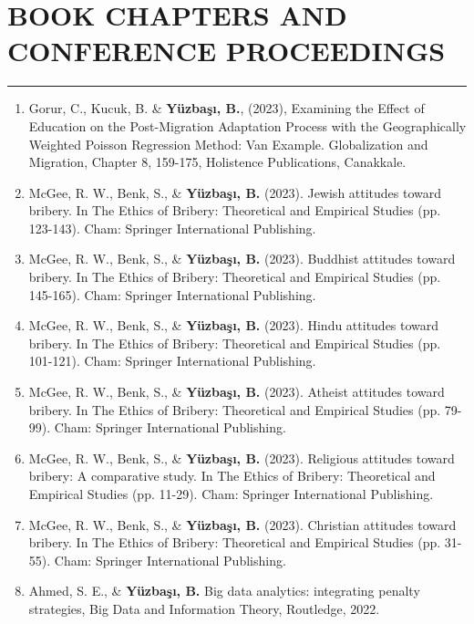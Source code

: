 \documentclass[10pt,letterpaper]{article}
\newcommand{\NewPart}[2]{%
	\Needspace{7\baselineskip}%
	\vspace{0.45em}%
	\section*{\sffamily\large\bfseries\color{MidnightBlue}\uppercase{#1} #2}%
	\vspace{-0.7em}\noindent\color{MidnightBlue}\rule{\textwidth}{0.55pt}\color{Black}\vspace{0.25em}}
\newenvironment{etaremune}{\begin{enumerate}}{\end{enumerate}}
\begin{document}
\NewPart{Book Chapters and Conference Proceedings}{}

\begin{etaremune}
\renewcommand{\theenumi}{B\arabic{enumi}}

\item Gorur, C., Kucuk, B. \& {\bf Y\"{u}zba\c{s}{\i}, B.}, (2023), Examining the Effect of Education on the Post-Migration Adaptation Process with the Geographically Weighted Poisson Regression Method: Van Example. Globalization and Migration, Chapter 8, 159-175, Holistence Publications, Canakkale.

\item McGee, R. W., Benk, S., \& {\bf Y\"{u}zba\c{s}{\i}, B.} (2023). Jewish attitudes toward bribery. In The Ethics of Bribery: Theoretical and Empirical Studies (pp. 123-143). Cham: Springer International Publishing.

\item McGee, R. W., Benk, S., \& {\bf Y\"{u}zba\c{s}{\i}, B.} (2023). Buddhist attitudes toward bribery. In The Ethics of Bribery: Theoretical and Empirical Studies (pp. 145-165). Cham: Springer International Publishing.

\item McGee, R. W., Benk, S., \& {\bf Y\"{u}zba\c{s}{\i}, B.} (2023). Hindu attitudes toward bribery. In The Ethics of Bribery: Theoretical and Empirical Studies (pp. 101-121). Cham: Springer International Publishing.

\item McGee, R. W., Benk, S., \& {\bf Y\"{u}zba\c{s}{\i}, B.} (2023). Atheist attitudes toward bribery. In The Ethics of Bribery: Theoretical and Empirical Studies (pp. 79-99). Cham: Springer International Publishing.

\item McGee, R. W., Benk, S., \& {\bf Y\"{u}zba\c{s}{\i}, B.} (2023). Religious attitudes toward bribery: A comparative study. In The Ethics of Bribery: Theoretical and Empirical Studies (pp. 11-29). Cham: Springer International Publishing.

\item McGee, R. W., Benk, S., \& {\bf Y\"{u}zba\c{s}{\i}, B.} (2023). Christian attitudes toward bribery. In The Ethics of Bribery: Theoretical and Empirical Studies (pp. 31-55). Cham: Springer International Publishing.

\item Ahmed, S. E., \& {\bf Y\"{u}zba\c{s}{\i}, B.} Big data analytics: integrating penalty strategies, Big Data and Information Theory, Routledge, 2022.


\end{etaremune}
\end{document}

